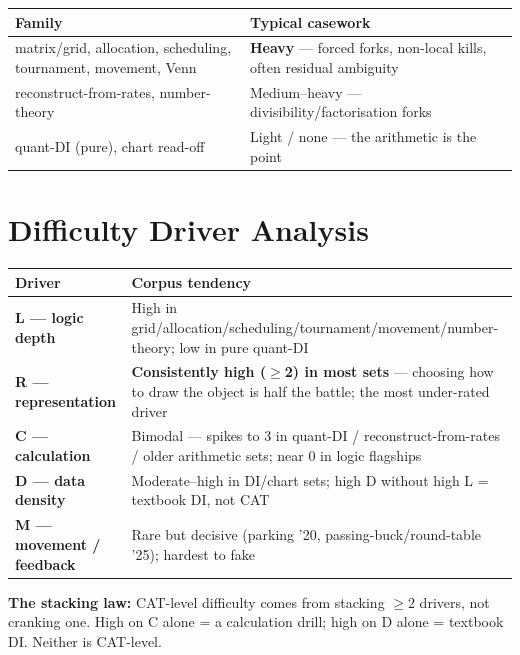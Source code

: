 \documentclass[11pt,a4paper]{article}
\begin{document}
\begin{center}
\begin{tabularx}{\textwidth}{lY}
\toprule
\textbf{Family} & \textbf{Typical casework} \\
\midrule
matrix/grid, allocation, scheduling, tournament, movement, Venn & \textbf{Heavy} --- forced forks, non-local kills, often residual ambiguity \\
reconstruct-from-rates, number-theory & Medium--heavy --- divisibility/factorisation forks \\
quant-DI (pure), chart read-off & Light / none --- the arithmetic is the point \\
\bottomrule
\end{tabularx}
\end{center}

\section{Difficulty Driver Analysis}

\begin{center}
\begin{tabularx}{\textwidth}{lY}
\toprule
\textbf{Driver} & \textbf{Corpus tendency} \\
\midrule
\textbf{L --- logic depth} & High in grid/allocation/scheduling/tournament/movement/number-theory; low in pure quant-DI \\
\textbf{R --- representation} & \textbf{Consistently high ($\ge$2) in most sets} --- choosing how to draw the object is half the battle; the most under-rated driver \\
\textbf{C --- calculation} & Bimodal --- spikes to 3 in quant-DI / reconstruct-from-rates / older arithmetic sets; near 0 in logic flagships \\
\textbf{D --- data density} & Moderate--high in DI/chart sets; high D without high L = textbook DI, not CAT \\
\textbf{M --- movement / feedback} & Rare but decisive (parking ’20, passing-buck/round-table ’25); hardest to fake \\
\bottomrule
\end{tabularx}
\end{center}

\textbf{The stacking law:} CAT-level difficulty comes from stacking $\ge2$ drivers, not cranking one. High on C alone = a calculation drill; high on D alone = textbook DI. Neither is CAT-level.
\end{document}
